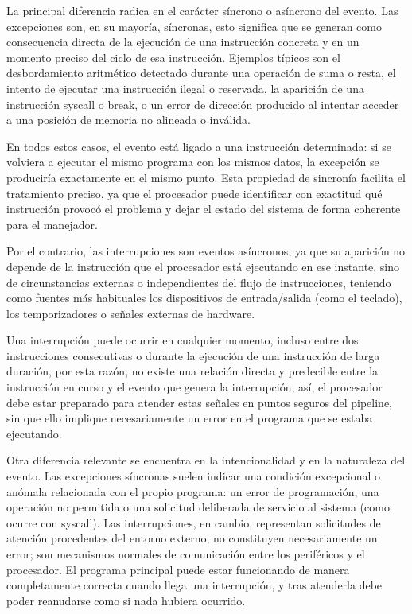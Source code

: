 \documentclass[12pt, letterpaper]{article}
\begin{document}
La principal diferencia radica en el carácter síncrono o asíncrono del evento. Las excepciones son, en su mayoría, síncronas, esto significa que se generan como consecuencia directa de la ejecución de una instrucción concreta y en un momento preciso del ciclo de esa instrucción. Ejemplos típicos son el desbordamiento aritmético detectado durante una operación de suma o resta, el intento de ejecutar una instrucción ilegal o reservada, la aparición de una instrucción syscall o break, o un error de dirección producido al intentar acceder a una posición de memoria no alineada o inválida.

En todos estos casos, el evento está ligado a una instrucción determinada: si se volviera a ejecutar el mismo programa con los mismos datos, la excepción se produciría exactamente en el mismo punto. Esta propiedad de sincronía facilita el tratamiento preciso, ya que el procesador puede identificar con exactitud qué instrucción provocó el problema y dejar el estado del sistema de forma coherente para el manejador.

Por el contrario, las interrupciones son eventos asíncronos, ya que su aparición no depende de la instrucción que el procesador está ejecutando en ese instante, sino de circunstancias externas o independientes del flujo de instrucciones, teniendo como fuentes más habituales los dispositivos de entrada/salida (como el teclado), los temporizadores o señales externas de hardware.
 
Una interrupción puede ocurrir en cualquier momento, incluso entre dos instrucciones consecutivas o durante la ejecución de una instrucción de larga duración, por esta razón, no existe una relación directa y predecible entre la instrucción en curso y el evento que genera la interrupción, así, el procesador debe estar preparado para atender estas señales en puntos seguros del pipeline, sin que ello implique necesariamente un error en el programa que se estaba ejecutando.

Otra diferencia relevante se encuentra en la intencionalidad y en la naturaleza del evento. Las excepciones síncronas suelen indicar una condición excepcional o anómala relacionada con el propio programa: un error de programación, una operación no permitida o una solicitud deliberada de servicio al sistema (como ocurre con syscall). Las interrupciones, en cambio, representan solicitudes de atención procedentes del entorno externo, no constituyen necesariamente un error; son mecanismos normales de comunicación entre los periféricos y el procesador. El programa principal puede estar funcionando de manera completamente correcta cuando llega una interrupción, y tras atenderla debe poder reanudarse como si nada hubiera ocurrido.
\end{document}
